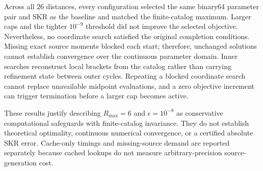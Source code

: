 Across all 26 distances, every configuration selected the same binary64 parameter pair and SKR as the baseline and matched the finite-catalog maximum. Larger caps and the tighter $10^{-9}$ threshold did not improve the selected objective. Nevertheless, no coordinate search satisfied the original completion conditions. Missing exact source moments blocked each start; therefore, unchanged solutions cannot establish convergence over the continuous parameter domain. Inner searches reconstruct local brackets from the catalog rather than carrying refinement state between outer cycles. Repeating a blocked coordinate search cannot replace unavailable midpoint evaluations, and a zero objective increment can trigger termination before a larger cap becomes active.

These results justify describing $R_{\max}=6$ and $\epsilon=10^{-8}$ as conservative computational safeguards with finite-catalog invariance. They do not establish theoretical optimality, continuous numerical convergence, or a certified absolute SKR error. Cache-only timings and missing-source demand are reported separately because cached lookups do not measure arbitrary-precision source-generation cost.
